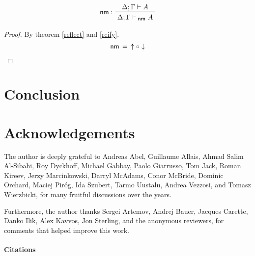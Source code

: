 \documentclass{entcs}
\numberwithin{equation}{thm}
\newcommand{\tsf}[1]{\textsf{\upshape{#1}}}
\newcommand{\stsf}[1]{\tsf{\small{#1}}}
\renewcommand{\:}{\mathrel{:}}
\newcommand{\tyrule}[1]{\prftree[l]{${#1} \:\,$}}
\newcommand{\comp}{\mathrel{\circ}}
\newcommand{\0}{\varnothing}
\renewcommand{\e}{\mathrel{\vdash}}
\newcommand{\enm}{\mathrel{\vdash_{\mkern-2mu\stsf{nm}}}}
\newcommand{\reflect}{\operatorname{\downarrow}}
\newcommand{\reify}{\operatorname{\uparrow}}
\newcommand{\nm}{\operatorname{\tsf{nm}}}
\begin{document}
\begin{corollary}[Normalisation]
  \label{nm}
  \begin{gather*}
    \tyrule{\nm}{\Delta; \Gamma \e A}{\Delta; \Gamma \enm A}
  \end{gather*}
  \begin{proof}
    \normalshape
    By theorem \ref{reflect} and \ref{reify}.
    \begin{gather*}
      \nm \,=\, \reify \comp \reflect
    \end{gather*}
  \end{proof}
\end{corollary}


\lipsum[1-5]


\section{Conclusion}

\lipsum[1-5]




\section*{Acknowledgements}

The author is deeply grateful to Andreas Abel, Guillaume Allais, Ahmad Salim Al-Sibahi, Roy Dyckhoff, Michael Gabbay, Paolo Giarrusso, Tom Jack, Roman Kireev, Jerzy Marcinkowski, Darryl McAdams, Conor McBride, Dominic Orchard, Maciej Pir\'{o}g, Ida Szubert, Tarmo Uustalu, Andrea Vezzosi, and Tomasz Wierzbicki, for many fruitful discussions over the years.

Furthermore, the author thanks Sergei Artemov, Andrej Bauer, Jacques Carette, Danko Ilik, Alex Kavvos, Jon Sterling, and the anonymous reviewers, for comments that helped improve this work.




\paragraph{Citations}
\end{document}
